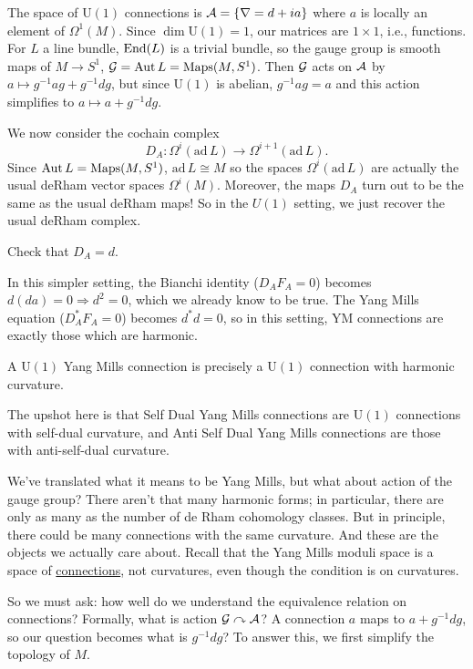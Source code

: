 \documentclass[main]{subfiles}
\begin{document}
The space of $\mathrm{U}(1)$ connections is $\mathcal{A} = \{\nabla = d+ia\}$ where $a$ is locally an element of $\Omega^1(M)$. Since $\dim \mathrm{U}(1) = 1$, our matrices are $1\times 1$, i.e., functions.
For $L$ a line bundle, $\operatorname{End}(L)$ is a trivial bundle, so the gauge group is smooth maps of $M \to S^1$, $\mathcal{G} = \operatorname{Aut} L = \mathrm{Maps}(M,S^1)$.
Then $\mathcal{G}$ acts on $\mathcal{A}$ by $a \mapsto g^{-1}ag + g^{-1}dg$, but since $\mathrm{U}(1)$ is abelian, $g^{-1}ag = a$ and this action simplifies to $a \mapsto a + g^{-1}dg$.

We now consider the cochain complex \[D_A: \Omega^i(\mathrm{ad}\, L) \to \Omega^{i+1}(\mathrm{ad}\, L).\] Since $\operatorname{Aut} L = \mathrm{Maps}(M,S^1)$, $\mathrm{ad}\, L \cong M$ so the spaces $\Omega^i(\mathrm{ad}\, L)$ are actually the usual deRham vector spaces $\Omega^i(M)$. 
Moreover, the maps $D_A$ turn out to be the same as the usual deRham maps! So in the $U(1)$ setting, we just recover the usual deRham complex.
\begin{exercise}
Check that $D_A = d$.
\end{exercise}

In this simpler setting, the Bianchi identity ($D_A F_A = 0$) becomes $d(da) = 0 \Rightarrow d^2=0$, which we already know to be true. The Yang Mills equation ($D_A^\ast F_A = 0$) becomes $d^\ast d = 0$, so in this setting, YM connections are exactly those which are harmonic.

\begin{lemma}
A $\mathrm{U}(1)$ Yang Mills connection is precisely a $\mathrm{U}(1)$ connection with harmonic curvature.
\end{lemma}

The upshot here is that Self Dual Yang Mills connections are $\mathrm{U}(1)$ connections with self-dual curvature, and Anti Self Dual Yang Mills connections are those with anti-self-dual curvature.

We've translated what it means to be Yang Mills, but what about action of the gauge group? There aren't that many harmonic forms; in particular, there are only as many as the number of de Rham cohomology classes. But in principle, there could be many connections with the same curvature. And these are the objects we actually care about. 
Recall that the Yang Mills moduli space is a space of \underline{connections}, not curvatures, even though the condition is on curvatures.

So we must ask: how well do we understand the equivalence relation on connections? Formally, what is action $\mathcal{G} \curvearrowright \mathcal{A}$? A connection $a$ maps to $a+g^{-1}dg$, so our question becomes what is $g^{-1}dg$? To answer this, we first simplify the topology of $M$.
\end{document}
